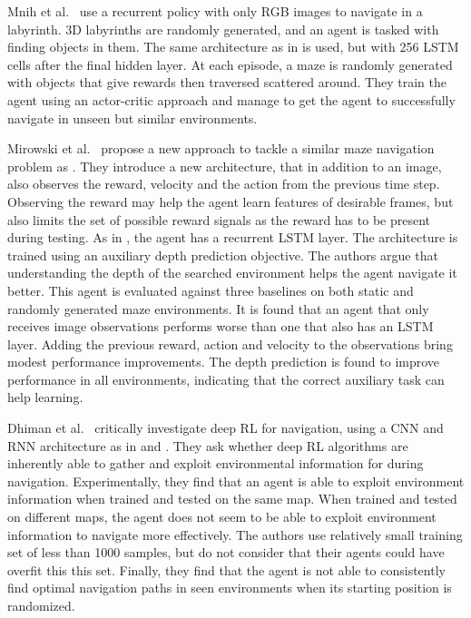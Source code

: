 Mnih et al.~\cite{mnih_asynchronous_2016} use a recurrent policy with only RGB images to navigate in a labyrinth.
3D labyrinths are randomly generated, and an agent is tasked with finding objects in them.
The same architecture as in \cite{mnih_human_2015} is used, but with 256 LSTM cells after the final hidden layer.
At each episode, a maze is randomly generated with objects that give rewards then traversed scattered around.
They train the agent using an actor-critic approach and manage to get the agent to successfully navigate in unseen but similar environments.

Mirowski et al.~\cite{mirowski_navigate_2017} propose a new approach to tackle a similar maze navigation problem as \cite{mnih_asynchronous_2016}.
They introduce a new architecture, that in addition to an image, also observes the reward, velocity and the action from the previous time step.
Observing the reward may help the agent learn features of desirable frames, but also limits the set of possible reward signals as the reward has to be present during testing.
As in \cite{mnih_asynchronous_2016}, the agent has a recurrent LSTM layer. 
The architecture is trained using an auxiliary depth prediction objective.
The authors argue that understanding the depth of the searched environment helps the agent navigate it better.
This agent is evaluated against three baselines on both static and randomly generated maze environments.
It is found that an agent that only receives image observations performs worse than one that also has an LSTM layer.
Adding the previous reward, action and velocity to the observations bring modest performance improvements.
The depth prediction is found to improve performance in all environments, indicating that the correct auxiliary task can help learning.

Dhiman et al.~\cite{dhiman_critical_2019} critically investigate deep RL for navigation, using a CNN and RNN architecture as in \cite{hausknecht_stone_2017} and \cite{mirowski_navigate_2017}.
They ask whether deep RL algorithms are inherently able to gather and exploit environmental information for during navigation.
Experimentally, they find that an agent is able to exploit environment information when trained and tested on the same map.
When trained and tested on different maps, the agent does not seem to be able to exploit environment information to navigate more effectively.
The authors use relatively small training set of less than 1000 samples, but do not consider that their agents could have overfit this this set.
Finally, they find that the agent is not able to consistently find optimal navigation paths in seen environments when its starting position is randomized.

